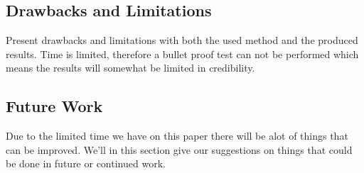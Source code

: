\documentclass[runningheads,a4paper,oribibl]{llncs}
\begin{document}
\subsection{Drawbacks and Limitations}
Present drawbacks and limitations with both the used method and the produced results. Time is limited, therefore a bullet proof test can not be performed which means the results will somewhat be limited in credibility.

\subsection{Future Work}
Due to the limited time we have on this paper there will be alot of things that can be improved. We'll in this section give our suggestions on things that could be done in future or continued work.

%
\nocite{*}  %

%
%
% 
%


\end{document}
